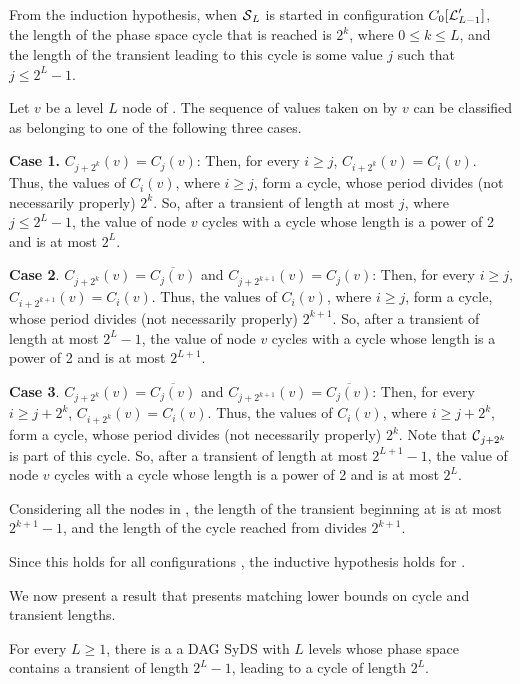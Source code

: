 From the induction hypothesis, 
when $\mbox{$\mathcal{S}$}_L$  is started in configuration $C_0[\mbox{$\mathcal{L}$}_{L-1}']$,
the length of the phase space cycle that is reached is $2^k$, where $0 \leq k \leq L$,
and the length of the transient leading to this cycle is some value $j$ such that $j \leq 2^L-1$.

Let $v$ be a level $L$ node of \cals{}.
The sequence of values taken on by $v$ 
can be classified as belonging to one of the following three cases.

{\bf Case 1.} $C_{j+2^k}(v) = C_j(v)$:
Then, for every $i \geq j$, $C_{i+2^k}(v) = C_i(v)$.
Thus, the values of $C_i(v)$, where $i \geq j$, form a cycle, 
whose period divides (not necessarily properly) $2^k$.
So, after a transient of length at most $j$, where $j \leq 2^L-1$,
the value of node $v$ cycles with a cycle whose length is a power of 2 and is at most $2^L$.

{\bf Case 2}. $C_{j+2^k}(v) = \overline{C_j(v)}$ and $C_{j+2^{k+1}}(v) = C_j(v)$:
Then, for every $i \geq j$, $C_{i+2^{k+1}}(v) = C_i(v)$.
Thus, the values of $C_i(v)$, where $i \geq j$, form a cycle, 
whose period divides (not necessarily properly) $2^{k+1}$.
So, after a transient of length at most $2^L-1$,
the value of node $v$ cycles with a cycle whose length is a power of 2 and is at most $2^{L+1}$.

{\bf Case 3}. $C_{j+2^k}(v) = \overline{C_j(v)}$ and $C_{j+2^{k+1}}(v) = \overline{C_j(v)}$:
Then, for every $i \geq j + 2^k$, $C_{i+2^k}(v) = C_i(v)$.
Thus, the values of $C_i(v)$, where $i \geq j + 2^k$, form a cycle, 
whose period divides (not necessarily properly) $2^k$.
Note that  $\mbox{$\mathcal{C}$}_{j+2^k}$ is part of this cycle.
So, after a transient of length at most $2^{L+1}-1$,
the value of node $v$ cycles with a cycle whose length is a power of 2 and is at most $2^L$.


Considering all the nodes in \cals{}, the length of the transient beginning at  \calc{} 
is at most $2^{k+1}-1$, 
and the length of the cycle reached from  \calc{} divides $2^{k+1}$.

Since this holds for all configurations \calc{}, 
the inductive hypothesis holds for \cals{}.
\QED
\fi

We now present a result that presents matching 
lower bounds on cycle and transient lengths.  

\begin{theorem}\label{thm:path_length_lower_bounds}
For every $L  \geq 1$,
there is a a DAG SyDS with $L$ levels
whose phase space contains a transient of length $2^L-1$,
leading to a cycle of length $2^L$.
\end{theorem}

